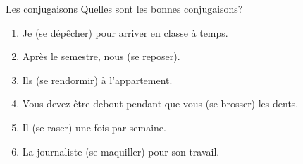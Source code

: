 \begin{frame}{Les conjugaisons}
  Quelles sont les bonnes conjugaisons? \\
  \begin{enumerate}
    \item Je \underline{} (se dépêcher) pour arriver en classe à temps.
    \item Après le semestre, nous \underline{} (se reposer).
    \item Ils \underline{} (se rendormir) à l'appartement.
    \item Vous devez être debout pendant que vous \underline{} (se brosser) les dents.
    \item Il \underline{} (se raser) une fois par semaine.
    \item La journaliste \underline{} (se maquiller) pour son travail.
  \end{enumerate}
\end{frame}